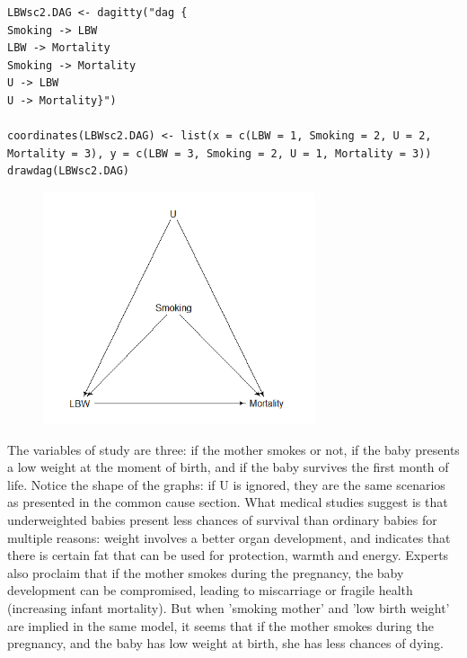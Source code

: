 \documentclass{article}
\begin{document}
\begin{lstlisting}
LBWsc2.DAG <- dagitty("dag {
Smoking -> LBW
LBW -> Mortality
Smoking -> Mortality
U -> LBW
U -> Mortality}")

coordinates(LBWsc2.DAG) <- list(x = c(LBW = 1, Smoking = 2, U = 2, Mortality = 3), y = c(LBW = 3, Smoking = 2, U = 1, Mortality = 3))
drawdag(LBWsc2.DAG)
\end{lstlisting}
\begin{figure}[h]
\includegraphics[width=8cm]{LBW2DAG.png}
\centering
\end{figure}
\newpage
The variables of study are three: if the mother smokes or not, if the baby presents a low weight at the moment of birth, and if the baby survives the first month of life. Notice the shape of the graphs: if U is ignored, they are the same scenarios as presented in the common cause section. What medical studies suggest is that underweighted babies present less chances of survival than ordinary babies for multiple reasons: weight involves a better organ development, and indicates that there is certain fat that can be used for protection, warmth and energy. Experts also proclaim that if the mother smokes during the pregnancy, the baby development can be compromised, leading to miscarriage or fragile health (increasing infant mortality). But when 'smoking mother' and 'low birth weight' are implied in the same model, it seems that if the mother smokes during the pregnancy, and the baby has low weight at birth, she has less chances of dying. 
\end{document}
